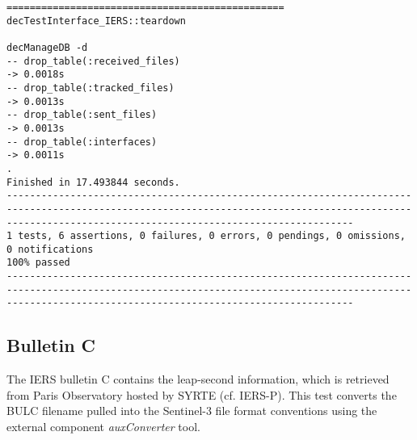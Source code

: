 \documentclass[dec_sum_main.tex]{subfiles}
\begin{document}
\begin{Verbatim}[fontsize=\tiny]
================================================
decTestInterface_IERS::teardown

decManageDB -d
-- drop_table(:received_files)
-> 0.0018s
-- drop_table(:tracked_files)
-> 0.0013s
-- drop_table(:sent_files)
-> 0.0013s
-- drop_table(:interfaces)
-> 0.0011s
.
Finished in 17.493844 seconds.
--------------------------------------------------------------------------------------------------------------------------------------------------------------------------------------------------------
1 tests, 6 assertions, 0 failures, 0 errors, 0 pendings, 0 omissions, 0 notifications
100% passed
--------------------------------------------------------------------------------------------------------------------------------------------------------------------------------------------------------	
\end{Verbatim}

\subsection{Bulletin C}
The IERS bulletin C contains the leap-second information, which is retrieved from Paris Observatory hosted by SYRTE (cf. IERS-P). This test converts the BULC filename pulled into the Sentinel-3 file format conventions using the external component \textit{auxConverter} tool.\newline

 \newline
\end{document}
